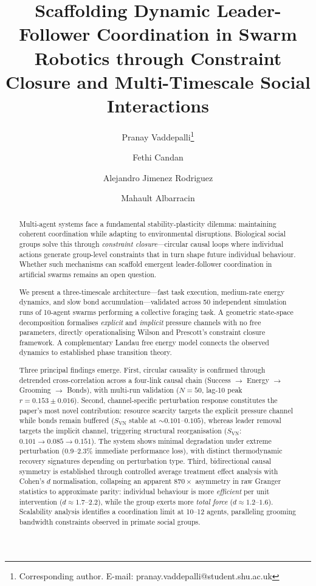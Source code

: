 \documentclass[12pt]{article}
\title{Scaffolding Dynamic Leader-Follower Coordination in Swarm Robotics through Constraint Closure and Multi-Timescale Social Interactions}
\author[1]{Pranay Vaddepalli\thanks{Corresponding author. E-mail: pranay.vaddepalli@student.shu.ac.uk}}
\author[2]{Fethi Candan}
\author[1]{Alejandro Jimenez Rodriguez}
\author[1]{Mahault Albarracin}
\affil[1]{Department of Computing, Sheffield Hallam University, Sheffield, UK}
\affil[2]{Department of Robotics, Erciyes University, Kayseri, Turkey}
\date{}
\begin{document}
\maketitle

\begin{abstract}
Multi-agent systems face a fundamental stability-plasticity dilemma: maintaining coherent coordination while adapting to environmental disruptions. Biological social groups solve this through \emph{constraint closure}---circular causal loops where individual actions generate group-level constraints that in turn shape future individual behaviour. Whether such mechanisms can scaffold emergent leader-follower coordination in artificial swarms remains an open question.

We present a three-timescale architecture---fast task execution, medium-rate energy dynamics, and slow bond accumulation---validated across 50 independent simulation runs of 10-agent swarms performing a collective foraging task. A geometric state-space decomposition formalises \emph{explicit} and \emph{implicit} pressure channels with no free parameters, directly operationalising Wilson and Prescott's constraint closure framework. A complementary Landau free energy model connects the observed dynamics to established phase transition theory.

Three principal findings emerge. First, circular causality is confirmed through detrended cross-correlation across a four-link causal chain (Success $\to$ Energy $\to$ Grooming $\to$ Bonds), with multi-run validation ($N=50$, lag-10 peak $r = 0.153 \pm 0.016$). Second, channel-specific perturbation response constitutes the paper's most novel contribution: resource scarcity targets the explicit pressure channel while bonds remain buffered ($S_\mathrm{VN}$ stable at ${\sim}0.101$--$0.105$), whereas leader removal targets the implicit channel, triggering structural reorganisation ($S_\mathrm{VN}$: $0.101 \to 0.085 \to 0.151$). The system shows minimal degradation under extreme perturbation (0.9--2.3\% immediate performance loss), with distinct thermodynamic recovery signatures depending on perturbation type. Third, bidirectional causal symmetry is established through controlled average treatment effect analysis with Cohen's $d$ normalisation, collapsing an apparent $870\times$ asymmetry in raw Granger statistics to approximate parity: individual behaviour is more \emph{efficient} per unit intervention ($d \approx 1.7$--$2.2$), while the group exerts more \emph{total force} ($d \approx 1.2$--$1.6$). Scalability analysis identifies a coordination limit at 10--12 agents, paralleling grooming bandwidth constraints observed in primate social groups.
\end{abstract}
\end{document}
